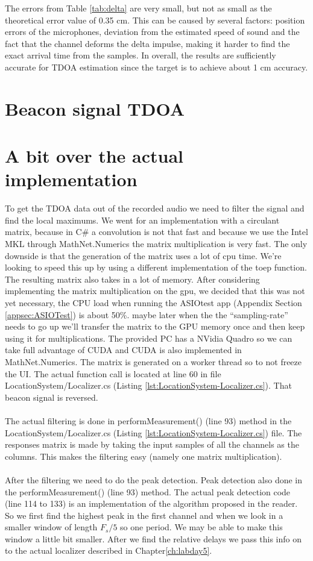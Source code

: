 \documentclass[final]{scrreprt} %
\begin{document}
The errors from Table \ref{tab:delta} are very small, but not as small as the theoretical error value of 0.35 cm.
This can be caused by several factors: position errors of the microphones, deviation from the estimated speed of sound and the fact that the channel deforms the delta impulse, making it harder to find the exact arrival time from the samples.
In overall, the results are sufficiently accurate for TDOA estimation since the target is to achieve about 1 cm accuracy.

\section{Beacon signal TDOA}


\section{A bit over the actual implementation}

To get the TDOA data out of the recorded audio we need to filter the signal and find the local maximums.
We went for an implementation with a circulant matrix, because in C\# a convolution is not that fast and because we use the Intel MKL through MathNet.Numerics the matrix multiplication is very fast.
The only downside is that the generation of the matrix uses a lot of cpu time.
We're looking to speed this up by using a different implementation of the toep function.
The resulting matrix also takes in a lot of memory.
After considering implementing the matrix multiplication on the gpu, we decided that this was not yet necessary, the CPU load when running the ASIOtest app (Appendix Section \ref{appsec:ASIOTest}) is about 50\%.
maybe later when the the ``sampling-rate'' needs to go up we'll transfer the matrix to the GPU memory once and then keep using it for multiplications. The provided PC has a NVidia Quadro so we can take full advantage of CUDA and CUDA is also implemented in MathNet.Numerics.
The matrix is generated on a worker thread so to not freeze the UI.
The actual function call is located at line 60 in file LocationSystem/Localizer.cs (Listing \ref{lst:LocationSystem-Localizer.cs}).
That beacon signal is reversed.
\\ \\
The actual filtering is done in performMeasurement() (line 93) method in the LocationSystem/Localizer.cs (Listing \ref{lst:LocationSystem-Localizer.cs}) file.
The responses matrix is made by taking the input samples of all the channels as the columns. 
This makes the filtering easy (namely one matrix multiplication).
\\ \\
After the filtering we need to do the peak detection. Peak detection also done in the performMeasurement() (line 93) method.
The actual peak detection code (line 114 to 133) is an implementation of the algorithm proposed in the reader.
So we first find the highest peak in the first channel and when we look in a smaller window of length $F_s/5$ so one period.
We may be able to make this window a little bit smaller.
After we find the relative delays we pass this info on to the actual localizer described in Chapter\ref{ch:labday5}.
\end{document}
